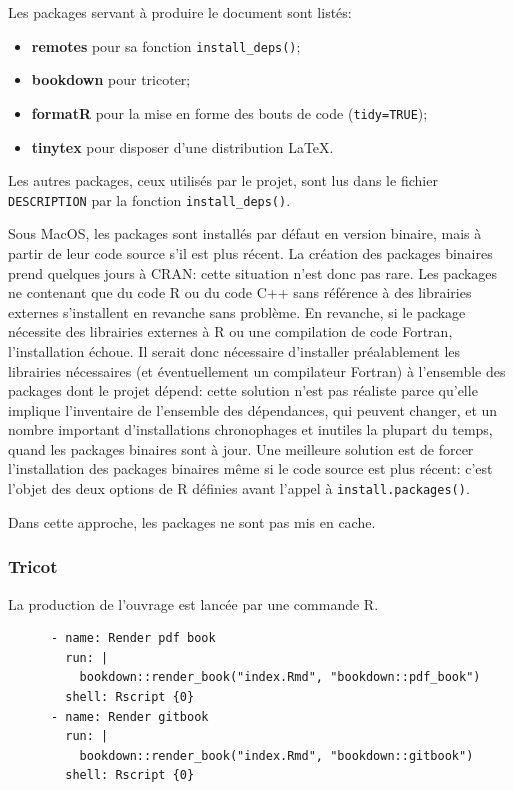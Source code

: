 \documentclass[
  12pt,
  french,
  a4paper,
  extrafontsizes,onecolumn,openright
  ]{memoir}
\providecommand{\tightlist}{%
  \setlength{\itemsep}{0pt}\setlength{\parskip}{0pt}}
\begin{document}
Les packages servant à produire le document sont listés:

\begin{itemize}
\tightlist
\item
  \textbf{remotes} pour sa fonction \texttt{install\_deps()};
\item
  \textbf{bookdown} pour tricoter;
\item
  \textbf{formatR} pour la mise en forme des bouts de code (\texttt{tidy=TRUE});
\item
  \textbf{tinytex} pour disposer d'une distribution LaTeX.
\end{itemize}

Les autres packages, ceux utilisés par le projet, sont lus dans le fichier \texttt{DESCRIPTION} par la fonction \texttt{install\_deps()}.

Sous MacOS, les packages sont installés par défaut en version binaire, mais à partir de leur code source s'il est plus récent.
La création des packages binaires prend quelques jours à CRAN: cette situation n'est donc pas rare.
Les packages ne contenant que du code R ou du code C++ sans référence à des librairies externes s'installent en revanche sans problème.
En revanche, si le package nécessite des librairies externes à R ou une compilation de code Fortran, l'installation échoue.
Il serait donc nécessaire d'installer préalablement les librairies nécessaires (et éventuellement un compilateur Fortran) à l'ensemble des packages dont le projet dépend: cette solution n'est pas réaliste parce qu'elle implique l'inventaire de l'ensemble des dépendances, qui peuvent changer, et un nombre important d'installations chronophages et inutiles la plupart du temps, quand les packages binaires sont à jour.
Une meilleure solution est de forcer l'installation des packages binaires même si le code source est plus récent: c'est l'objet des deux options de R définies avant l'appel à \texttt{install.packages()}.

Dans cette approche, les packages ne sont pas mis en cache.

\hypertarget{tricot}{%
\subsubsection{Tricot}\label{tricot}}

La production de l'ouvrage est lancée par une commande R.

\begin{verbatim}
      - name: Render pdf book
        run: |
          bookdown::render_book("index.Rmd", "bookdown::pdf_book")
        shell: Rscript {0}
      - name: Render gitbook
        run: |
          bookdown::render_book("index.Rmd", "bookdown::gitbook")
        shell: Rscript {0}
\end{verbatim}
\end{document}
